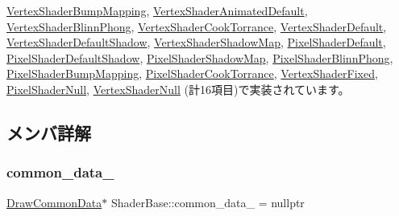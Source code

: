 \mbox{\hyperlink{class_vertex_shader_bump_mapping_abed4e0aa9655fa7a7a21e03d00e7c0e5}{Vertex\+Shader\+Bump\+Mapping}}, \mbox{\hyperlink{class_vertex_shader_animated_default_a683f221e9b70d13fdb63e7b8fb15f31c}{Vertex\+Shader\+Animated\+Default}}, \mbox{\hyperlink{class_vertex_shader_blinn_phong_a26af54fcf9adccbe449a65d7a078c02f}{Vertex\+Shader\+Blinn\+Phong}}, \mbox{\hyperlink{class_vertex_shader_cook_torrance_ab2cc9cc8ed675abc5f1194a82bc8d405}{Vertex\+Shader\+Cook\+Torrance}}, \mbox{\hyperlink{class_vertex_shader_default_a8091b23a7742804b4e9d8de4bee17f44}{Vertex\+Shader\+Default}}, \mbox{\hyperlink{class_vertex_shader_default_shadow_aee16a04757ab1698d76bdca43834c633}{Vertex\+Shader\+Default\+Shadow}}, \mbox{\hyperlink{class_vertex_shader_shadow_map_a5b36c3531d6116c609c8a62bc4ffd95d}{Vertex\+Shader\+Shadow\+Map}}, \mbox{\hyperlink{class_pixel_shader_default_af195bc2ba2e5f7352d4b762b20825d95}{Pixel\+Shader\+Default}}, \mbox{\hyperlink{class_pixel_shader_default_shadow_abd9b03c980fed91c4fc14bbab244adbd}{Pixel\+Shader\+Default\+Shadow}}, \mbox{\hyperlink{class_pixel_shader_shadow_map_aa95a200a1bf5bd91ffaa526a647818f1}{Pixel\+Shader\+Shadow\+Map}}, \mbox{\hyperlink{class_pixel_shader_blinn_phong_a50450f0ad9c6c0ad011361ee153088af}{Pixel\+Shader\+Blinn\+Phong}}, \mbox{\hyperlink{class_pixel_shader_bump_mapping_a004f731db6dab6b59949baed4a5a32d7}{Pixel\+Shader\+Bump\+Mapping}}, \mbox{\hyperlink{class_pixel_shader_cook_torrance_af2af86383b1724d1bf1364533a07fc5a}{Pixel\+Shader\+Cook\+Torrance}}, \mbox{\hyperlink{class_vertex_shader_fixed_a49f630aee4757c8fd8bae886f22dfeb0}{Vertex\+Shader\+Fixed}}, \mbox{\hyperlink{class_pixel_shader_null_adca4c44cd25c90a5ebd75b459f5e641e}{Pixel\+Shader\+Null}}, \mbox{\hyperlink{class_vertex_shader_null_adf758f295d2803c6d8bd7e05e461abec}{Vertex\+Shader\+Null}} (計16項目)で実装されています。



\subsection{メンバ詳解}
\mbox{\label{class_shader_base_a35b31a286a2d5df521f504e3d883da02}} 
\subsubsection{\texorpdfstring{common\+\_\+data\+\_\+}{common\_data\_}}
{\footnotesize\ttfamily \mbox{\hyperlink{class_draw_common_data}{Draw\+Common\+Data}}$\ast$ Shader\+Base\+::common\+\_\+data\+\_\+ = nullptr\hspace{0.3cm}{\ttfamily [private]}}



